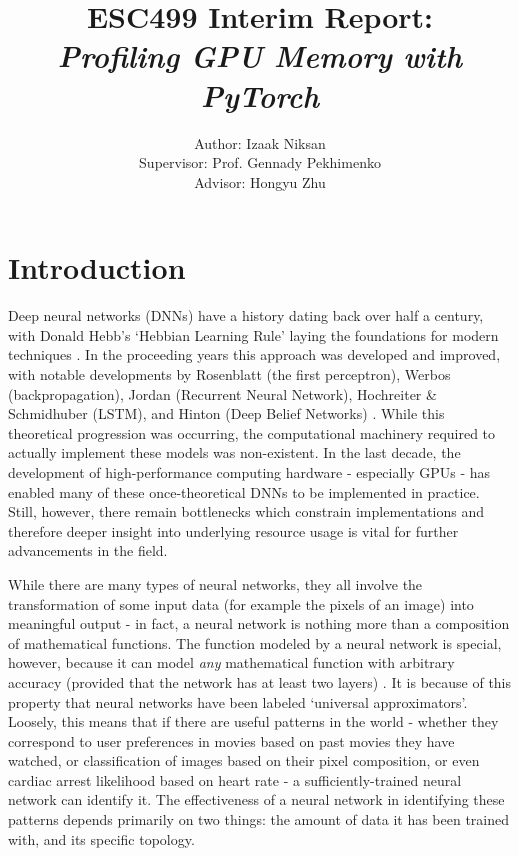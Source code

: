 \documentclass[12pt,letterpaper]{article}
\begin{document}
\title{\textbf{ESC499 Interim Report:\\ \textit{Profiling GPU Memory with PyTorch}}}

\author{Author: Izaak Niksan\\
Supervisor: Prof. Gennady Pekhimenko\\
Advisor: Hongyu Zhu
}

\maketitle

\section{Introduction}
Deep neural networks (DNNs) have a history dating back over half a century, with Donald Hebb's \enquote*{Hebbian Learning Rule} laying the foundations for modern techniques \cite{dnn_history}. In the proceeding years this approach was developed and improved, with notable developments by Rosenblatt (the first perceptron), Werbos (backpropagation), Jordan (Recurrent Neural Network), Hochreiter \& Schmidhuber (LSTM), and Hinton (Deep Belief Networks) \cite{dnn_history}. While this theoretical progression was occurring, the computational machinery required to actually implement these models was non-existent. In the last decade, the development of high-performance computing hardware - especially GPUs - has enabled many of these once-theoretical DNNs to be implemented in practice. Still, however, there remain bottlenecks which constrain implementations and therefore deeper insight into underlying resource usage is vital for further advancements in the field. \par 

While there are many types of neural networks, they all involve the transformation of some input data (for example the pixels of an image) into meaningful output - in fact, a neural network is nothing more than a composition of mathematical functions. The function modeled by a neural network is special, however, because it can model \textit{any} mathematical function with arbitrary accuracy (provided that the network has at least two layers) \cite{dnn_history}. It is because of this property that neural networks have been labeled \enquote*{universal approximators}. Loosely, this means that if there are useful patterns in the world - whether they correspond to user preferences in movies based on past movies they have watched, or classification of images based on their pixel composition, or even cardiac arrest likelihood based on heart rate - a sufficiently-trained neural network can identify it. The effectiveness of a neural network in identifying these patterns depends primarily on two things: the amount of data it has been trained with, and its specific topology.
\par
\end{document}
